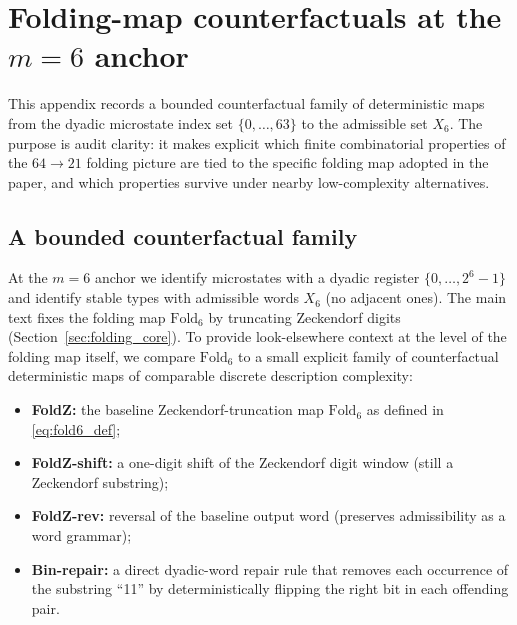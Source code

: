 \section[Folding-map counterfactuals]{Folding-map counterfactuals at the \texorpdfstring{$m=6$}{m=6} anchor}
\label{app:fold_family_sensitivity}

This appendix records a bounded counterfactual family of deterministic maps from the dyadic microstate index set $\{0,\dots,63\}$ to the admissible set $X_6$.
The purpose is audit clarity: it makes explicit which finite combinatorial properties of the $64\to 21$ folding picture are tied to the specific folding map adopted in the paper, and which properties survive under nearby low-complexity alternatives.

\subsection{A bounded counterfactual family}
At the $m=6$ anchor we identify microstates with a dyadic register $\{0,\dots,2^6-1\}$ and identify stable types with admissible words $X_6$ (no adjacent ones).
The main text fixes the folding map $\mathrm{Fold}_6$ by truncating Zeckendorf digits (Section~\ref{sec:folding_core}).
To provide look-elsewhere context at the level of the folding map itself, we compare $\mathrm{Fold}_6$ to a small explicit family of counterfactual deterministic maps of comparable discrete description complexity:
\begin{itemize}
\item \textbf{FoldZ:} the baseline Zeckendorf-truncation map $\mathrm{Fold}_6$ as defined in \eqref{eq:fold6_def};
\item \textbf{FoldZ-shift:} a one-digit shift of the Zeckendorf digit window (still a Zeckendorf substring);
\item \textbf{FoldZ-rev:} reversal of the baseline output word (preserves admissibility as a word grammar);
\item \textbf{Bin-repair:} a direct dyadic-word repair rule that removes each occurrence of the substring ``11'' by deterministically flipping the right bit in each offending pair.
\end{itemize}

